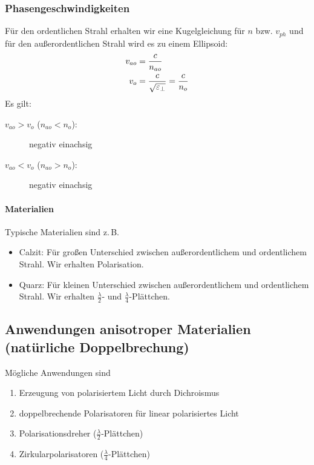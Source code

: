 \subsubsection{Phasengeschwindigkeiten}
Für den ordentlichen Strahl erhalten wir eine Kugelgleichung für $n$
bzw. $v_{ph}$ und für den außerordentlichen Strahl wird es zu einem
Ellipsoid:
\begin{align*}
  v_{ao} &= \frac{c}{n_{ao}}\\
  v_o &= \frac{c}{\sqrt{\varepsilon_\bot}} = \frac{c}{n_{o}}\\
\end{align*}
Es gilt:
\begin{description}
\item[$v_{ao}>v_o$ ($n_{ao}<n_o$):] negativ einachsig
\item[$v_{ao}<v_o$ ($n_{ao}>n_o$):] negativ einachsig
\end{description}


\paragraph{Materialien}
Typische Materialien sind z.\,B.
\begin{itemize}
\item Calzit: Für großen Unterschied zwischen außerordentlichem und
  ordentlichem Strahl. Wir erhalten Polarisation.
\item Quarz: Für kleinen Unterschied zwischen außerordentlichem und
  ordentlichem Strahl. Wir erhalten $\frac{\lambda}{2}$- und
  $\frac{\lambda}{4}$-Plättchen.
\end{itemize}


\subsection[natürliche Doppelbrechung]%
{Anwendungen anisotroper Materialien (natürliche Doppelbrechung)}
Mögliche Anwendungen sind
\begin{enumerate}
\item Erzeugung von polarisiertem Licht durch Dichroismus
\item doppelbrechende Polarisatoren für linear polarisiertes Licht
\item Polarisationsdreher ($\frac{\lambda}{2}$-Plättchen)
\item Zirkularpolarisatoren ($\frac{\lambda}{4}$-Plättchen)
\end{enumerate}

